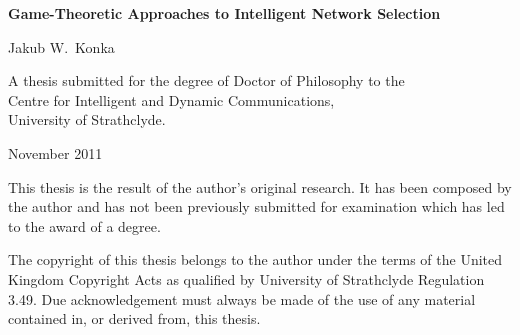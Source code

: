 \begin{titlepage}
\begin{RaggedRight}

\vspace*{2.2cm}

{\bf\sffamily\Huge Game-Theoretic Approaches to Intelligent Network Selection}

\par
\vspace{2cm}

{\sffamily\Large Jakub W.~Konka}

\par
\vspace{6.5cm}

A thesis submitted for the degree of Doctor of Philosophy to the \\Centre for Intelligent and Dynamic Communications,\\ University of Strathclyde.

\par
\vspace{1cm}

November 2011

\cleardoublepage


\vspace*{2.2cm}

This thesis is the result of the author's original research. It has been composed by the author and has not been previously submitted for examination which has led to the award of a degree.

\cleardoublepage

\vspace*{2.2cm}

The copyright of this thesis belongs to the author under the terms of the United Kingdom Copyright Acts as qualified by University of Strathclyde Regulation 3.49. Due acknowledgement must always be made of the use of any material contained in, or derived from, this thesis.

\cleardoublepage
\end{RaggedRight}
\end{titlepage}